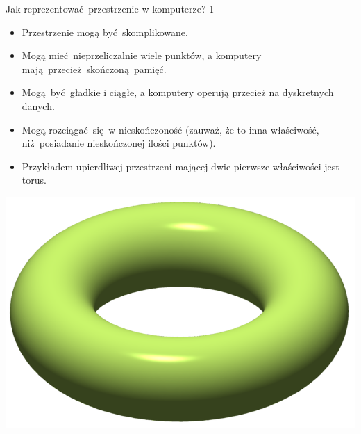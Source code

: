 \documentclass{beamer}
\begin{document}
\begin{frame}{Jak reprezentować przestrzenie w komputerze? 1}
\begin{itemize}
	\item Przestrzenie mogą być skomplikowane.
	\item Mogą mieć nieprzeliczalnie wiele punktów, a komputery mają przecież skończoną pamięć.
	\item Mogą być gładkie i ciągłe, a komputery operują przecież na dyskretnych danych.
	\item Mogą rozciągać się w nieskończoność (zauważ, że to inna właściwość, niż posiadanie nieskończonej ilości punktów).
	\item Przykładem upierdliwej przestrzeni mającej dwie pierwsze właściwości jest torus.
\end{itemize}

\begin{center}
\includegraphics[scale = 1]{Torus.png}
\end{center}

\end{frame}
\end{document}
